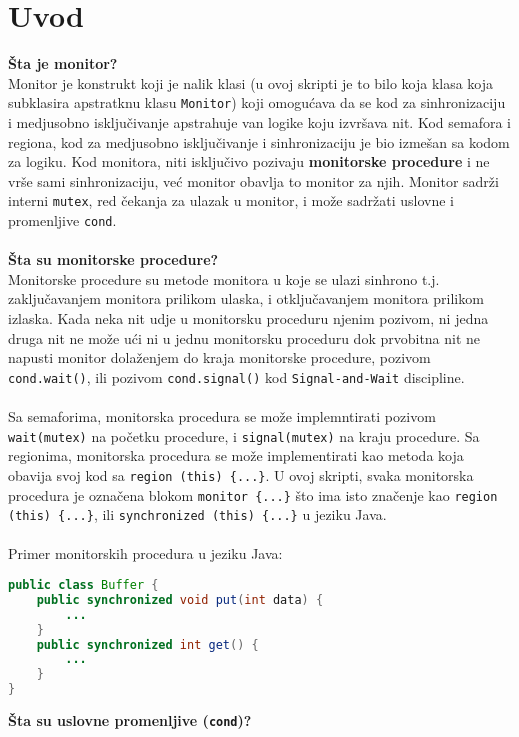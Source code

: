 \section{Uvod}
\textbf{\v{S}ta je monitor?}\\
Monitor je konstrukt koji je nalik klasi (u ovoj skripti je to bilo koja klasa koja subklasira apstratknu klasu \texttt{Monitor}) koji omogu\'{c}ava da se kod za sinhronizaciju i medjusobno isklju\v{c}ivanje apstrahuje van logike koju izvr\v{s}ava nit. Kod semafora i regiona, kod za medjusobno isklju\v{c}ivanje i sinhronizaciju je bio izme\v{s}an sa kodom za logiku. Kod monitora, niti isklju\v{c}ivo pozivaju \textbf{monitorske procedure} i ne vr\v{s}e sami sinhronizaciju, ve\'{c} monitor obavlja to monitor za njih. Monitor sadr\v{z}i interni \texttt{mutex}, red \v{c}ekanja za ulazak u monitor, i mo\v{z}e sadr\v{z}ati uslovne i promenljive \texttt{cond}.
\\\\
\textbf{\v{S}ta su monitorske procedure?}\\
Monitorske procedure su metode monitora u koje se ulazi sinhrono t.j. zaklju\v{c}avanjem monitora prilikom ulaska, i otklju\v{c}avanjem monitora prilikom izlaska. Kada neka nit udje u monitorsku proceduru njenim pozivom, ni jedna druga nit ne mo\v{z}e u\'{c}i ni u jednu monitorsku proceduru dok prvobitna nit ne napusti monitor dola\v{z}enjem do kraja monitorske procedure, pozivom \texttt{cond.wait()}, ili pozivom \texttt{cond.signal()} kod \texttt{Signal-and-Wait} discipline.
\\\\
Sa semaforima, monitorska procedura se mo\v{z}e implemntirati pozivom \texttt{wait(mutex)} na po\v{c}etku procedure, i \texttt{signal(mutex)} na kraju procedure. Sa regionima, monitorska procedura se mo\v{z}e implementirati kao metoda koja obavija svoj kod sa \texttt{region (this) \{...\}}. U ovoj skripti, svaka monitorska procedura je ozna\v{c}ena blokom \texttt{monitor \{...\}} \v{s}to ima isto zna\v{c}enje kao \texttt{region (this) \{...\}}, ili \texttt{synchronized (this) \{...\}} u jeziku Java.\\\\
Primer monitorskih procedura u jeziku Java:
\begin{lstlisting}[language=java]
public class Buffer {
    public synchronized void put(int data) {
        ...
    }
    public synchronized int get() {
        ...
    }
}
\end{lstlisting}
\textbf{\v{S}ta su uslovne promenljive (\texttt{cond})?}\\
